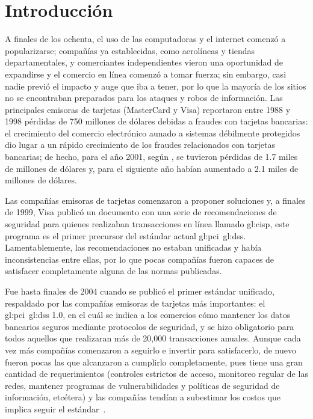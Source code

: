 %
%
%

\chapter{Introducción}

A finales de los ochenta, el uso de las computadoras y el internet comenzó a
popularizarse; compañías ya establecidas, como aerolíneas y tiendas
departamentales, y comerciantes independientes vieron una oportunidad de
expandirse y el comercio en línea comenzó a tomar fuerza; sin embargo, casi
nadie previó el impacto y auge que iba a tener, por lo que la mayoría de los
sitios no se encontraban preparados para los ataques y robos de información.
Las principales emisoras de tarjetas (MasterCard y Visa) reportaron entre 1988 y
1998 pérdidas de 750 millones de dólares debidas a fraudes con
tarjetas bancarias: el crecimiento del comercio electrónico aunado a
sistemas débilmente protegidos dio lugar a un rápido crecimiento de los
fraudes relacionados con tarjetas bancarias; de hecho, para el año 2001,
según \cite{wallethub}, se tuvieron pérdidas de 1.7 miles de millones de
dólares y, para el siguiente año habían aumentado a 2.1 miles de millones de
dólares.

Las compañías emisoras de tarjetas comenzaron a proponer soluciones y,
a finales de 1999, Visa publicó un documento con una serie de recomendaciones
de seguridad para quienes realizaban transacciones en línea llamado
\gls{gl:cisp}, este programa es el primer precursor del estándar actual
\gls{gl:pci}~\gls{gl:dss}. Lamentablemente, las recomendaciones no estaban
unificadas y había inconsistencias entre ellas, por lo que pocas compañías
fueron capaces de satisfacer completamente alguna de las normas publicadas.

Fue hasta finales de 2004 cuando se publicó el primer estándar unificado,
respaldado por las compañías emisoras de tarjetas más importantes: el
\gls{gl:pci}~\gls{gl:dss} 1.0, en el cuál se indica a los comercios cómo
mantener los datos bancarios seguros mediante protocolos de seguridad, y se hizo
obligatorio para todos aquellos que realizaran más de 20,000 transacciones
anuales. Aunque cada vez más compañías comenzaron a seguirlo e invertir para
satisfacerlo, de nuevo fueron pocas las que alcanzaron a cumplirlo
completamente, pues tiene una gran cantidad de requerimientos (controles
estrictos de acceso, monitoreo regular de las redes, mantener programas de
vulnerabilidades y políticas de seguridad de información, etcétera) y las
compañías tendían a subestimar los costos que implica seguir el
estándar~\cite{uk_association, search_security}.

